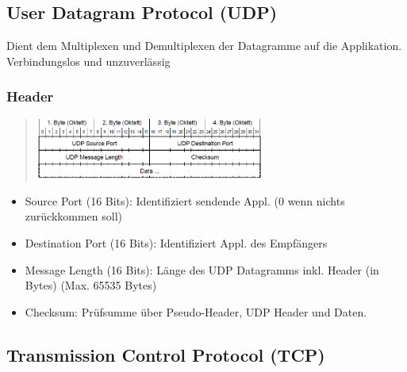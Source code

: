 \subsection*{User Datagram Protocol (UDP)}

Dient dem Multiplexen und Demultiplexen der Datagramme auf die Applikation.
Verbindungslos und unzuverlässig


\subsubsection*{Header}
\begin{verse}
\includegraphics[height=2cm]{part3/UDP_Header}\end{verse}
\begin{itemize}
\item Source Port (16 Bits): Identifiziert sendende Appl. (0 wenn nichts
zurückkommen soll)
\item Destination Port (16 Bits): Identifiziert Appl. des Empfängers
\item Message Length (16 Bits): Länge des UDP Datagramms inkl. Header (in
Bytes) (Max. 65535 Bytes)
\item Checksum: Prüfsumme über Pseudo-Header, UDP Header und Daten.
\end{itemize}

\subsection*{Transmission Control Protocol (TCP)}

